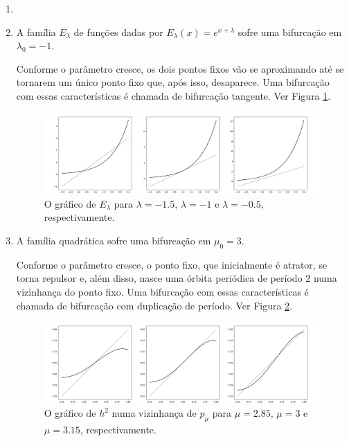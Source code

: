 \begin{example}
\begin{enumerate}[label=\alph*)]\item[]
\item 
A família $E_\lambda$ de funções dadas por $E_\lambda(x) = e^{x + \lambda}$ sofre uma bifurcação em $\lambda_0 = -1$.

Conforme o parâmetro cresce, os dois pontos fixos vão se aproximando até se tornarem um único ponto fixo que, após isso, desaparece. Uma bifurcação com essas características é chamada de bifurcação tangente. Ver Figura \ref{fig e_lambda}.

\begin{figure}[!htb]
\label{fig e_lambda}
\centering
\includegraphics[scale=0.25]{images/e_lambda.png}
\caption{O gráfico de $E_\lambda$ para $\lambda = -1.5$, $\lambda = -1$ e $\lambda = -0.5$, respectivamente.}
\end{figure}

\item A família quadrática sofre uma bifurcação em $\mu_0 = 3$.

Conforme o parâmetro cresce, o ponto fixo, que inicialmente é atrator, se torna repulsor e, além disso, nasce uma órbita periódica de período $2$ numa vizinhança do ponto fixo. Uma bifurcação com essas características é chamada de bifurcação com duplicação de período. Ver Figura \ref{fig h_mu^2}.

\begin{figure}[!htb]
\label{fig h_mu^2}
\centering
\includegraphics[scale=0.3]{images/h_mu^2.png}
\caption{O gráfico de $h^2$ numa vizinhança de $p_\mu$ para $\mu = 2.85$, $\mu = 3$ e $\mu = 3.15$, respectivamente.}
\end{figure}

\end{enumerate}
\end{example}

